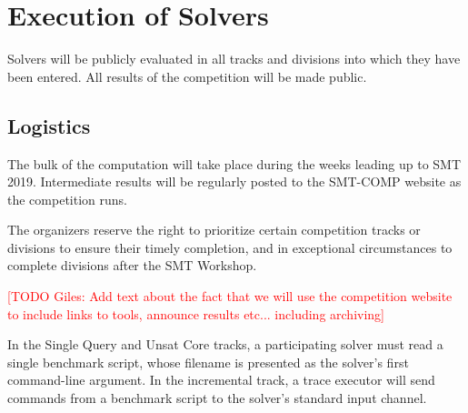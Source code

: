 \documentclass[12pt]{article}
\newcommand{\rem}[1]{\textcolor{red}{[#1]}}
\newcommand{\todo}[1]{\rem{TODO #1}}
\newcommand{\main}{Single Query\xspace}
\newcommand{\ucore}{Unsat Core\xspace}
\begin{document}
\section{Execution of Solvers}

Solvers will be publicly evaluated in all tracks and divisions into
which they have been entered.  All results of the competition will be
made public.

\subsection{Logistics}
\label{sec:logistics}

%
The bulk of the computation will take place during the weeks leading
up to SMT 2019.  Intermediate results will be regularly posted to the
SMT-COMP website as the competition runs.

The organizers reserve the right to prioritize certain competition
tracks or divisions to ensure their timely completion, and in
exceptional circumstances to complete divisions after the SMT
Workshop.



\todo{Giles: Add text about the fact that we will use the competition website to include links to tools, announce results etc... including archiving}
%

%
In the \main and \ucore tracks, a participating solver must read a
single benchmark script, whose filename is presented as the solver's
first command-line argument.  In the incremental track, a trace
executor will send commands from a benchmark script to the solver's
standard input channel.
\end{document}

